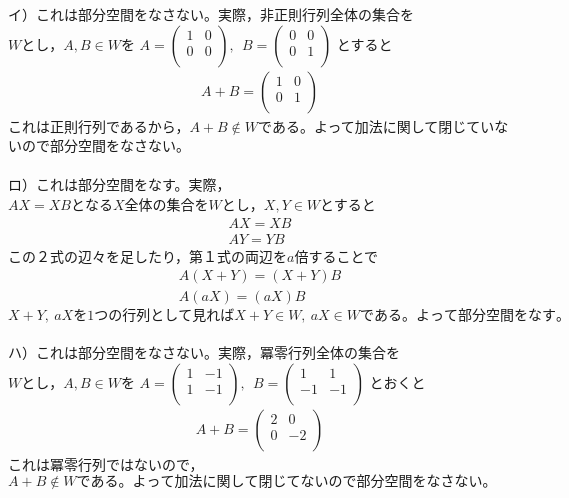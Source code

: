 \documentclass[dvipdfmx,uplatex,11pt]{jsarticle}
\begin{document}
イ）これは部分空間をなさない。実際，非正則行列全体の集合を$Wとし，A,B \in W$を
$
A=
\begin{pmatrix}
1 & 0 \\
0 & 0 \\
\end{pmatrix}
,~~
B=
\begin{pmatrix}
0 & 0 \\
0 & 1 \\
\end{pmatrix}
$
とすると
\begin{eqnarray*}
A+B=
\begin{pmatrix}
1 & 0 \\
0 & 1 \\
\end{pmatrix}
\end{eqnarray*}
これは正則行列であるから，$A+B \not\in W$である。よって加法に関して閉じていないので部分空間をなさない。\\
\dotfill \\
ロ）これは部分空間をなす。実際，$AX=XBとなるX全体の集合をWとし，X,Y \in W$とすると
\begin{eqnarray*}
AX=XB \\
AY=YB
\end{eqnarray*}
この２式の辺々を足したり，第１式の両辺を$a$倍することで
\begin{eqnarray*}
A(X+Y)=(X+Y)B \\
A(aX)=(aX)B
\end{eqnarray*}
$X+Y,~aXを1つの行列として見ればX+Y \in W,~aX \in Wである。よって部分空間をなす。$\\
\dotfill \\
ハ）これは部分空間をなさない。実際，冪零行列全体の集合を$Wとし，A,B \in Wを$
$
A=
\begin{pmatrix}
1 & -1 \\
1 & -1 \\
\end{pmatrix}
,~~
B=
\begin{pmatrix}
1 & 1 \\
-1 & -1 \\
\end{pmatrix}
$
とおくと
\begin{eqnarray*}
A+B=
\begin{pmatrix}
2 & 0 \\
0 & -2 \\
\end{pmatrix}
\end{eqnarray*}
これは冪零行列ではないので，$A+B \not\in Wである。よって加法に関して閉じてないので部分空間をなさない。$\\
\end{document}
